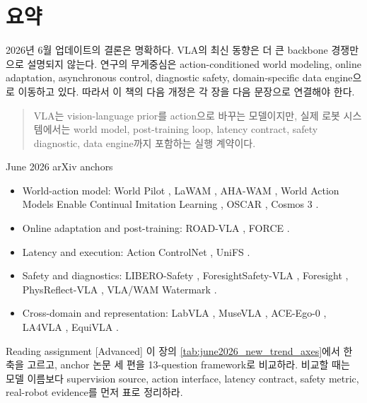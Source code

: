 \section{요약}

2026년 6월 업데이트의 결론은 명확하다. VLA의 최신 동향은 더 큰 backbone 경쟁만으로 설명되지 않는다. 연구의 무게중심은 action-conditioned world modeling, online adaptation, asynchronous control, diagnostic safety, domain-specific data engine으로 이동하고 있다. 따라서 이 책의 다음 개정은 각 장을 다음 문장으로 연결해야 한다.

\begin{quote}
VLA는 vision-language prior를 action으로 바꾸는 모델이지만, 실제 로봇 시스템에서는 world model, post-training loop, latency contract, safety diagnostic, data engine까지 포함하는 실행 계약이다.
\end{quote}

\begin{sourcebox}{June 2026 arXiv anchors}
\begin{itemize}
  \item World-action model: World Pilot \citep{worldpilot2026}, LaWAM \citep{lawam2026}, AHA-WAM \citep{ahawam2026}, World Action Models Enable Continual Imitation Learning \citep{regenwam2026}, OSCAR \citep{oscar2026}, Cosmos 3 \citep{cosmos3}.
  \item Online adaptation and post-training: ROAD-VLA \citep{roadvla2026}, FORCE \citep{forcevla2026}.
  \item Latency and execution: Action ControlNet \citep{actioncontrolnet2026}, UniFS \citep{unifs2026}.
  \item Safety and diagnostics: LIBERO-Safety \citep{liberosafety2026}, ForesightSafety-VLA \citep{foresightsafety2026}, Foresight \citep{foresight2026}, PhysReflect-VLA \citep{physreflectvla2026}, VLA/WAM Watermark \citep{vlawatermark2026}.
  \item Cross-domain and representation: LabVLA \citep{labvla2026}, MuseVLA \citep{musevla2026}, ACE-Ego-0 \citep{aceego2026}, LA4VLA \citep{la4vla2026}, EquiVLA \citep{equivla2026}.
\end{itemize}
\end{sourcebox}

\begin{assignmentbox}{Reading assignment [Advanced]}
이 장의 \cref{tab:june2026_new_trend_axes}에서 한 축을 고르고, anchor 논문 세 편을 13-question framework로 비교하라. 비교할 때는 모델 이름보다 supervision source, action interface, latency contract, safety metric, real-robot evidence를 먼저 표로 정리하라.
\end{assignmentbox}

